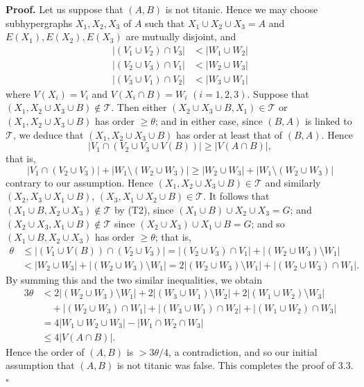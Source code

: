 \textbf{Proof.} Let us suppose that $(A, B)$ is not titanic. Hence we may choose subhypergraphs $X_1, X_2, X_3$ of $A$ such that $X_1 \cup X_2 \cup X_3 = A$ and $E(X_1), E(X_2), E(X_3)$ are mutually disjoint, and
\begin{align*}
|(V_1 \cup V_2) \cap V_3| &< |W_1 \cup W_2| \\
|(V_2 \cup V_3) \cap V_1| &< |W_2 \cup W_3| \\
|(V_3 \cup V_1) \cap V_2| &< |W_3 \cup W_1|
\end{align*}
where $V(X_i) = V_i$ and $V(X_i \cap B) = W_i$ $(i = 1, 2, 3)$. Suppose that $(X_1, X_2 \cup X_3 \cup B) \notin \mathscr{T}$. Then either $(X_2 \cup X_3 \cup B, X_1) \in \mathscr{T}$ or $(X_1, X_2 \cup X_3 \cup B)$ has order $\ge \theta$; and in either case, since $(B, A)$ is linked to $\mathscr{T}$, we deduce that $(X_1, X_2 \cup X_3 \cup B)$ has order at least that of $(B, A)$. Hence
\begin{equation*}
|V_1 \cap (V_2 \cup V_3 \cup V(B))| \ge |V(A \cap B)|,
\end{equation*}
that is,
\begin{equation*}
|V_1 \cap (V_2 \cup V_3)| + |W_1 \setminus (W_2 \cup W_3)| \ge |W_2 \cup W_3| + |W_1 \setminus (W_2 \cup W_3)|
\end{equation*}
contrary to our assumption. Hence $(X_1, X_2 \cup X_3 \cup B) \in \mathscr{T}$ and similarly $(X_2, X_3 \cup X_1 \cup B)$, $(X_3, X_1 \cup X_2 \cup B) \in \mathscr{T}$. It follows that $(X_1 \cup B, X_2 \cup X_3) \notin \mathscr{T}$ by (T2), since $(X_1 \cup B) \cup X_2 \cup X_3 = G$; and $(X_2 \cup X_3, X_1 \cup B) \notin \mathscr{T}$ since $(X_2 \cup X_3) \cup X_1 \cup B = G$; and so $(X_1 \cup B, X_2 \cup X_3)$ has order $\ge \theta$; that is,
\begin{align*}
\theta &\le |(V_1 \cup V(B)) \cap (V_2 \cup V_3)| = |(V_2 \cup V_3) \cap V_1| + |(W_2 \cup W_3) \setminus W_1| \\
&< |W_2 \cup W_3| + |(W_2 \cup W_3) \setminus W_1| = 2|(W_2 \cup W_3) \setminus W_1| + |(W_2 \cup W_3) \cap W_1|.
\end{align*}
By summing this and the two similar inequalities, we obtain
\begin{align*}
3\theta &< 2|(W_2 \cup W_3) \setminus W_1| + 2|(W_3 \cup W_1) \setminus W_2| + 2|(W_1 \cup W_2) \setminus W_3| \\
&\quad + |(W_2 \cup W_3) \cap W_1| + |(W_3 \cup W_1) \cap W_2| + |(W_1 \cup W_2) \cap W_3| \\
&= 4|W_1 \cup W_2 \cup W_3| - |W_1 \cap W_2 \cap W_3| \\
&\le 4|V(A \cap B)|.
\end{align*}
Hence the order of $(A, B)$ is $> 3\theta/4$, a contradiction, and so our initial assumption that $(A, B)$ is not titanic was false. This completes the proof of 3.3. $\square$

